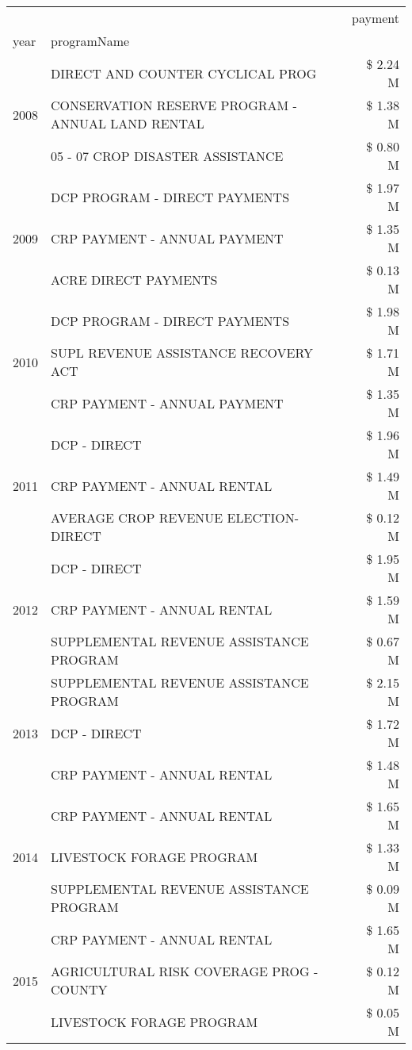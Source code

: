\begin{tabular}{llr}
\toprule
 &  & payment \\
year & programName &  \\
\midrule
\multirow[t]{3}{*}{2008} & DIRECT AND COUNTER CYCLICAL PROG & \$ 2.24 M \\
 & CONSERVATION RESERVE PROGRAM - ANNUAL LAND RENTAL & \$ 1.38 M \\
 & 05 - 07 CROP DISASTER ASSISTANCE & \$ 0.80 M \\
\cline{1-3}
\multirow[t]{3}{*}{2009} & DCP PROGRAM - DIRECT PAYMENTS & \$ 1.97 M \\
 & CRP PAYMENT - ANNUAL PAYMENT & \$ 1.35 M \\
 & ACRE DIRECT PAYMENTS & \$ 0.13 M \\
\cline{1-3}
\multirow[t]{3}{*}{2010} & DCP PROGRAM - DIRECT PAYMENTS & \$ 1.98 M \\
 & SUPL REVENUE ASSISTANCE RECOVERY ACT & \$ 1.71 M \\
 & CRP PAYMENT - ANNUAL PAYMENT & \$ 1.35 M \\
\cline{1-3}
\multirow[t]{3}{*}{2011} & DCP - DIRECT & \$ 1.96 M \\
 & CRP PAYMENT - ANNUAL RENTAL & \$ 1.49 M \\
 & AVERAGE CROP REVENUE ELECTION-DIRECT & \$ 0.12 M \\
\cline{1-3}
\multirow[t]{3}{*}{2012} & DCP - DIRECT & \$ 1.95 M \\
 & CRP PAYMENT - ANNUAL RENTAL & \$ 1.59 M \\
 & SUPPLEMENTAL REVENUE ASSISTANCE PROGRAM & \$ 0.67 M \\
\cline{1-3}
\multirow[t]{3}{*}{2013} & SUPPLEMENTAL REVENUE ASSISTANCE PROGRAM & \$ 2.15 M \\
 & DCP - DIRECT & \$ 1.72 M \\
 & CRP PAYMENT - ANNUAL RENTAL & \$ 1.48 M \\
\cline{1-3}
\multirow[t]{3}{*}{2014} & CRP PAYMENT - ANNUAL RENTAL & \$ 1.65 M \\
 & LIVESTOCK FORAGE PROGRAM & \$ 1.33 M \\
 & SUPPLEMENTAL REVENUE ASSISTANCE PROGRAM & \$ 0.09 M \\
\cline{1-3}
\multirow[t]{3}{*}{2015} & CRP PAYMENT - ANNUAL RENTAL & \$ 1.65 M \\
 & AGRICULTURAL RISK COVERAGE PROG - COUNTY & \$ 0.12 M \\
 & LIVESTOCK FORAGE PROGRAM & \$ 0.05 M \\
\cline{1-3}

\end{tabular}
